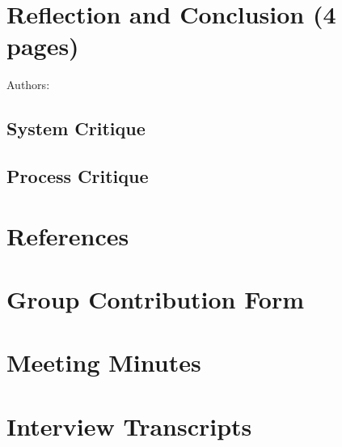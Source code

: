 \documentclass[12pt,a4paper]{article}
\begin{document}
\section{Reflection and Conclusion (4 pages)}
Authors:
\label{sec:reflection}
\subsection{System Critique}

\subsection{Process Critique}


\newpage

\section*{References}
% 

\newpage
\appendix

\section{Group Contribution Form}

\section{Meeting Minutes}

\section{Interview Transcripts}
\end{document}
